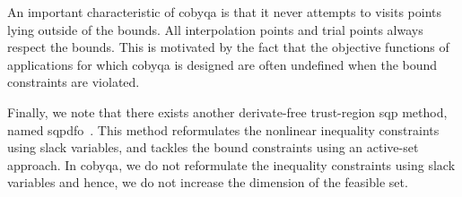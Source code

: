 An important characteristic of \gls{cobyqa} is that it never attempts to visits points lying outside of the bounds.
All interpolation points and trial points always respect the bounds.
This is motivated by the fact that the objective functions of applications for which \gls{cobyqa} is designed are often undefined when the bound constraints are violated.

Finally, we note that there exists another derivate-free trust-region \gls{sqp} method, named \gls{sqpdfo}~\cite{Troltzsch_2016,Gratton_Toint_Troltzsch_2011,Troltzsch_Ilic_Siggel_2021}.
This method reformulates the nonlinear inequality constraints using slack variables, and tackles the bound constraints using an active-set approach.
In \gls{cobyqa}, we do not reformulate the inequality constraints using slack variables and hence, we do not increase the dimension of the feasible set.
